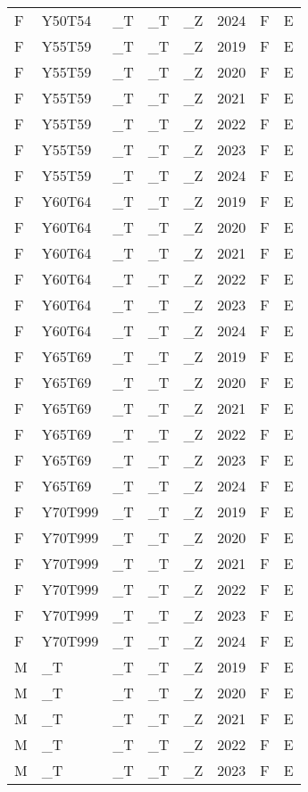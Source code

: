 \begin{longtable}[t]{llllllll}
F & Y50T54 & \_T & \_T & \_Z & 2024 & F & E\\
F & Y55T59 & \_T & \_T & \_Z & 2019 & F & E\\
F & Y55T59 & \_T & \_T & \_Z & 2020 & F & E\\
\addlinespace
F & Y55T59 & \_T & \_T & \_Z & 2021 & F & E\\
F & Y55T59 & \_T & \_T & \_Z & 2022 & F & E\\
F & Y55T59 & \_T & \_T & \_Z & 2023 & F & E\\
F & Y55T59 & \_T & \_T & \_Z & 2024 & F & E\\
F & Y60T64 & \_T & \_T & \_Z & 2019 & F & E\\
\addlinespace
F & Y60T64 & \_T & \_T & \_Z & 2020 & F & E\\
F & Y60T64 & \_T & \_T & \_Z & 2021 & F & E\\
F & Y60T64 & \_T & \_T & \_Z & 2022 & F & E\\
F & Y60T64 & \_T & \_T & \_Z & 2023 & F & E\\
F & Y60T64 & \_T & \_T & \_Z & 2024 & F & E\\
\addlinespace
F & Y65T69 & \_T & \_T & \_Z & 2019 & F & E\\
F & Y65T69 & \_T & \_T & \_Z & 2020 & F & E\\
F & Y65T69 & \_T & \_T & \_Z & 2021 & F & E\\
F & Y65T69 & \_T & \_T & \_Z & 2022 & F & E\\
F & Y65T69 & \_T & \_T & \_Z & 2023 & F & E\\
\addlinespace
F & Y65T69 & \_T & \_T & \_Z & 2024 & F & E\\
F & Y70T999 & \_T & \_T & \_Z & 2019 & F & E\\
F & Y70T999 & \_T & \_T & \_Z & 2020 & F & E\\
F & Y70T999 & \_T & \_T & \_Z & 2021 & F & E\\
F & Y70T999 & \_T & \_T & \_Z & 2022 & F & E\\
\addlinespace
F & Y70T999 & \_T & \_T & \_Z & 2023 & F & E\\
F & Y70T999 & \_T & \_T & \_Z & 2024 & F & E\\
M & \_T & \_T & \_T & \_Z & 2019 & F & E\\
M & \_T & \_T & \_T & \_Z & 2020 & F & E\\
M & \_T & \_T & \_T & \_Z & 2021 & F & E\\
\addlinespace
M & \_T & \_T & \_T & \_Z & 2022 & F & E\\
M & \_T & \_T & \_T & \_Z & 2023 & F & E\\

\end{longtable}
